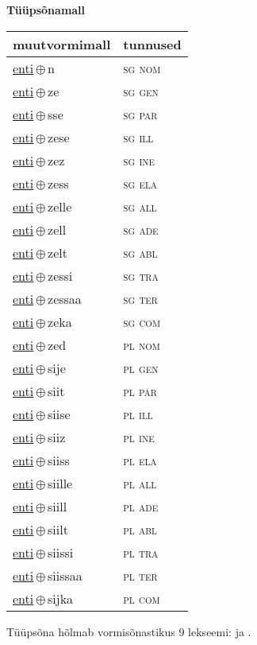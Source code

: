 

\vspace{3.5em}
\noindent \begin{minipage}{\textwidth}
\noindent \textbf{Tüüpsõnamall \,}\\

\begin{sideways}
\begin{tabular}{l l}
muutvormimall & tunnused \\
\hline
\underline{enti}\,$\oplus$\,n & \textsc{ sg nom } \\
\underline{enti}\,$\oplus$\,ze & \textsc{ sg gen } \\
\underline{enti}\,$\oplus$\,sse & \textsc{ sg par } \\
\underline{enti}\,$\oplus$\,zese & \textsc{ sg ill } \\
\underline{enti}\,$\oplus$\,zez & \textsc{ sg ine } \\
\underline{enti}\,$\oplus$\,zess & \textsc{ sg ela } \\
\underline{enti}\,$\oplus$\,zelle & \textsc{ sg all } \\
\underline{enti}\,$\oplus$\,zell & \textsc{ sg ade } \\
\underline{enti}\,$\oplus$\,zelt & \textsc{ sg abl } \\
\underline{enti}\,$\oplus$\,zessi & \textsc{ sg tra } \\
\underline{enti}\,$\oplus$\,zessaa & \textsc{ sg ter } \\
\underline{enti}\,$\oplus$\,zeka & \textsc{ sg com } \\
\underline{enti}\,$\oplus$\,zed & \textsc{ pl nom } \\
\underline{enti}\,$\oplus$\,sije & \textsc{ pl gen } \\
\underline{enti}\,$\oplus$\,siit & \textsc{ pl par } \\
\underline{enti}\,$\oplus$\,siise & \textsc{ pl ill } \\
\underline{enti}\,$\oplus$\,siiz & \textsc{ pl ine } \\
\underline{enti}\,$\oplus$\,siiss & \textsc{ pl ela } \\
\underline{enti}\,$\oplus$\,siille & \textsc{ pl all } \\
\underline{enti}\,$\oplus$\,siill & \textsc{ pl ade } \\
\underline{enti}\,$\oplus$\,siilt & \textsc{ pl abl } \\
\underline{enti}\,$\oplus$\,siissi & \textsc{ pl tra } \\
\underline{enti}\,$\oplus$\,siissaa & \textsc{ pl ter } \\
\underline{enti}\,$\oplus$\,sijka & \textsc{ pl com } \\
\end{tabular}
\end{sideways}
\label{tab:tüüpsõnamall-entin}

\end{minipage}

 
\vspace{1em}
\noindent Tüüpsõna hõlmab vormisõnastikus 9 lekseemi:  ja .
